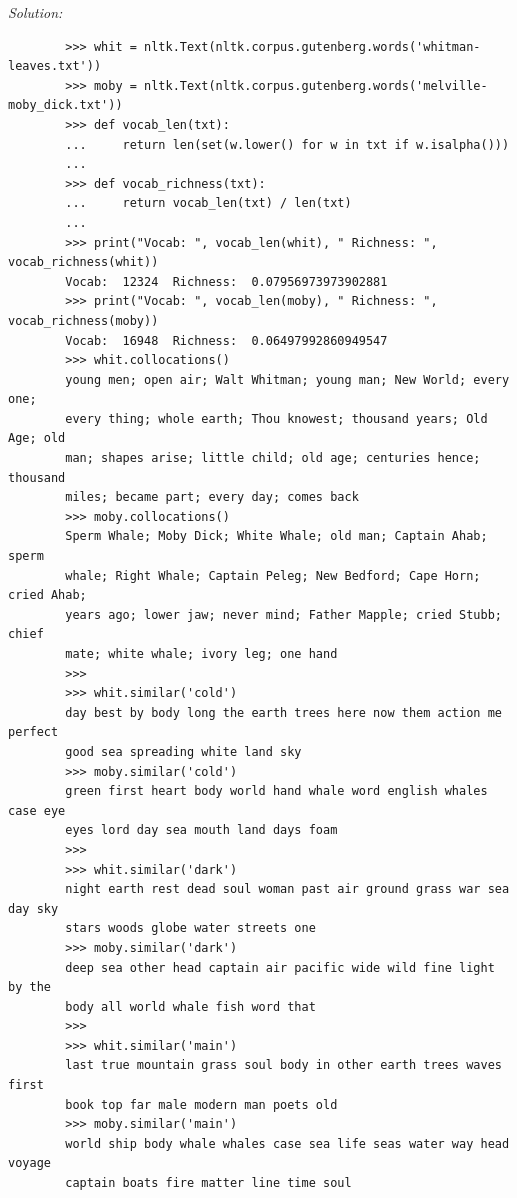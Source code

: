 \documentclass[11pt]{article}
\newenvironment{solution}{
	\vspace{10px}\noindent\emph{Solution:}
}{
	\vspace{10px}
}
\begin{document}
\begin{solution}
	\begin{lstlisting}
		>>> whit = nltk.Text(nltk.corpus.gutenberg.words('whitman-leaves.txt'))
		>>> moby = nltk.Text(nltk.corpus.gutenberg.words('melville-moby_dick.txt'))
		>>> def vocab_len(txt):
		...     return len(set(w.lower() for w in txt if w.isalpha()))
		...
		>>> def vocab_richness(txt):
		...     return vocab_len(txt) / len(txt)
		...
		>>> print("Vocab: ", vocab_len(whit), " Richness: ", vocab_richness(whit))
		Vocab:  12324  Richness:  0.07956973973902881
		>>> print("Vocab: ", vocab_len(moby), " Richness: ", vocab_richness(moby))
		Vocab:  16948  Richness:  0.06497992860949547
		>>> whit.collocations()
		young men; open air; Walt Whitman; young man; New World; every one;
		every thing; whole earth; Thou knowest; thousand years; Old Age; old
		man; shapes arise; little child; old age; centuries hence; thousand
		miles; became part; every day; comes back
		>>> moby.collocations()
		Sperm Whale; Moby Dick; White Whale; old man; Captain Ahab; sperm
		whale; Right Whale; Captain Peleg; New Bedford; Cape Horn; cried Ahab;
		years ago; lower jaw; never mind; Father Mapple; cried Stubb; chief
		mate; white whale; ivory leg; one hand
		>>>
		>>> whit.similar('cold')
		day best by body long the earth trees here now them action me perfect
		good sea spreading white land sky
		>>> moby.similar('cold')
		green first heart body world hand whale word english whales case eye
		eyes lord day sea mouth land days foam
		>>>
		>>> whit.similar('dark')
		night earth rest dead soul woman past air ground grass war sea day sky
		stars woods globe water streets one
		>>> moby.similar('dark')
		deep sea other head captain air pacific wide wild fine light by the
		body all world whale fish word that
		>>>
		>>> whit.similar('main')
		last true mountain grass soul body in other earth trees waves first
		book top far male modern man poets old
		>>> moby.similar('main')
		world ship body whale whales case sea life seas water way head voyage
		captain boats fire matter line time soul
	
	\end{lstlisting}
	
	
\end{solution}  
\end{document}
